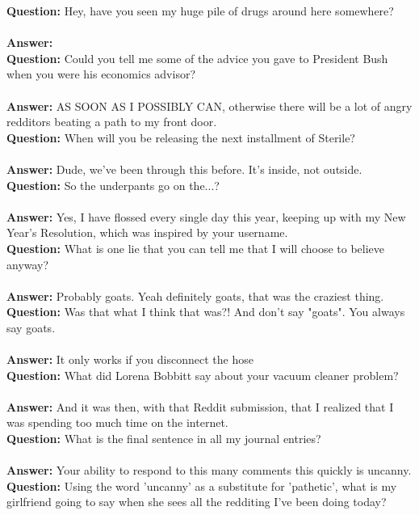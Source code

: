 \documentclass[a4paper]{article}
\begin{document}
\textbf{Question:} Hey, have you seen my huge pile of drugs around here somewhere? \\ \\
\textbf{Answer:}  \\
\textbf{Question:} Could you tell me some of the advice you gave to President Bush when you were his economics advisor? \\ \\
\textbf{Answer:} AS SOON AS I POSSIBLY CAN, otherwise there will be a lot of angry redditors beating a path to my front door. \\
\textbf{Question:} When will you be releasing the next installment of Sterile? \\ \\
\textbf{Answer:} Dude, we've been through this before. It's inside, not outside. \\
\textbf{Question:} So the underpants go on the...? \\ \\
\textbf{Answer:} Yes, I have flossed every single day this year, keeping up with my New Year's Resolution, which was inspired by your username. \\
\textbf{Question:} What is one lie that you can tell me that I will choose to believe anyway? \\ \\
\textbf{Answer:} Probably goats. Yeah definitely goats, that was the craziest thing. \\
\textbf{Question:} Was that what I think that was?! And don't say "goats". You always say goats. \\ \\
\textbf{Answer:} It only works if you disconnect the hose \\
\textbf{Question:} What did Lorena Bobbitt say about your vacuum cleaner problem? \\ \\
\textbf{Answer:} And it was then, with that Reddit submission, that I realized that I was spending too much time on the internet. \\
\textbf{Question:} What is the final sentence in all my journal entries? \\ \\
\textbf{Answer:} Your ability to respond to this many comments this quickly is uncanny. \\
\textbf{Question:} Using the word 'uncanny' as a substitute for 'pathetic', what is my girlfriend going to say when she sees all the redditing I've been doing today? \\
\end{document}
